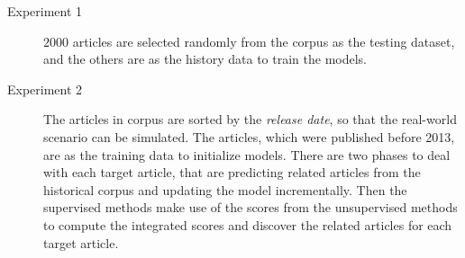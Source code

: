 \begin{description}
\item[Experiment 1] $2000$ articles are selected randomly from the corpus as the testing dataset, and the others are as the history data to train the models. 
\item[Experiment 2] The articles in corpus are sorted by the \textit{release date}, so that the real-world scenario can be simulated. The articles, which were published before 2013, are as the training data to initialize models. There are two phases to deal with each target article, that are predicting related articles from the historical corpus and updating the model incrementally. Then the supervised methods make use of the scores from the unsupervised methods to compute the integrated scores and discover the related articles for each target article. 
\end{description}

